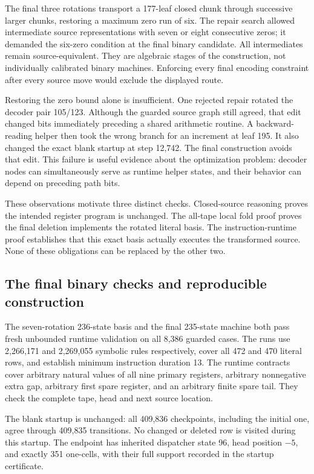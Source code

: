 The final three rotations transport a 177-leaf closed chunk through
successive larger chunks, restoring a maximum zero run of six.  The
repair search allowed intermediate source representations with seven
or eight consecutive zeros; it demanded the six-zero condition at the
final binary candidate.  All intermediates remain source-equivalent.
They are algebraic stages of the construction, not individually
calibrated binary machines.  Enforcing every final encoding constraint
after every source move would exclude the displayed route.

Restoring the zero bound alone is insufficient.  One rejected repair
rotated the decoder pair 105/123.  Although the guarded source graph
still agreed, that edit changed bits immediately preceding a shared
arithmetic routine.  A backward-reading helper then took the wrong
branch for an increment at leaf 195.  It also changed the exact blank
startup at step 12,742.  The final construction avoids that edit.
This failure is useful evidence about the optimization problem:
decoder nodes can simultaneously serve as runtime helper states, and
their behavior can depend on preceding path bits.

These observations motivate three distinct checks.  Closed-source
reasoning proves the intended register program is unchanged.  The
all-tape local fold proof proves the final deletion implements the
rotated literal basis.  The instruction-runtime proof establishes
that this exact basis actually executes the transformed source.  None
of these obligations can be replaced by the other two.

\subsection{The final binary checks and reproducible construction}

The seven-rotation 236-state basis and the final 235-state machine both
pass fresh unbounded runtime validation on all 8,386 guarded cases.
The runs use 2,266,171 and 2,269,055 symbolic rules respectively, cover
all 472 and 470 literal rows, and establish minimum instruction duration
13.  The runtime contracts cover arbitrary natural values of all nine
primary registers, arbitrary nonnegative extra gap, arbitrary first
spare register, and an arbitrary finite spare tail.  They check the
complete tape, head and next source location.

The blank startup is unchanged: all 409,836 checkpoints, including
the initial one, agree through 409,835 transitions.  No changed or
deleted row is visited during this startup.  The endpoint has inherited
dispatcher state 96, head position $-5$, and exactly 351 one-cells,
with their full support recorded in the startup certificate.

